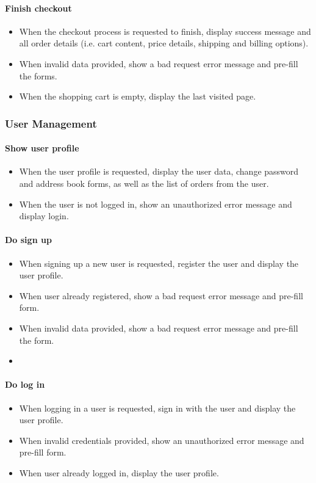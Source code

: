 \begin{appendices}
\paragraph{Finish checkout}
\begin{itemize}
	\item When the checkout process is requested to finish, display success message and all order details (i.e. cart content, price details, shipping and billing options).
	\item When invalid data provided, show a bad request error message and pre-fill the forms.
	\item When the shopping cart is empty, display the last visited page.
\end{itemize}
 
\subsubsection{User Management}
\paragraph{Show user profile}
\begin{itemize}
	\item When the user profile is requested, display the user data, change password and address book forms, as well as the list of orders from the user.
	\item When the user is not logged in, show an unauthorized error message and display login.
\end{itemize}

\paragraph{Do sign up}
\begin{itemize}
	\item When signing up a new user is requested, register the user and display the user profile.
	\item When user already registered, show a bad request error message and pre-fill form.
	\item When invalid data provided, show a bad request error message and pre-fill the form.
	\item 
\end{itemize}

\paragraph{Do log in}
\begin{itemize}
	\item When logging in a user is requested, sign in with the user and display the user profile.
	\item When invalid credentials provided, show an unauthorized error message and pre-fill form.
	\item When user already logged in, display the user profile.
\end{itemize}


\end{appendices}
